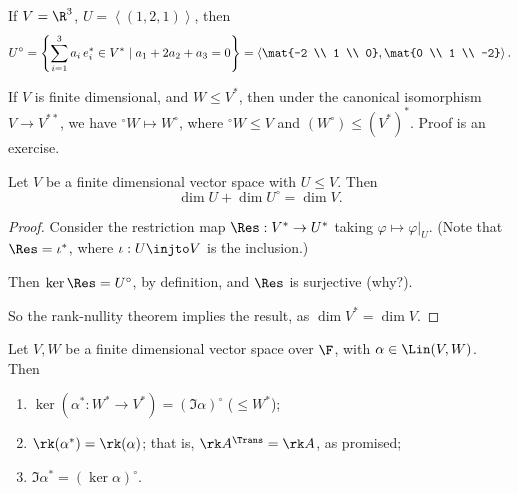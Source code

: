 \begin{example}
	If $V=\R^3$, $U=\left\langle (1,2,1) \right\rangle$, then %
	\begin{equation*}
		U^\circ = \left\{\sum_{i=1}^3 a_i\,e_i^* \in V^* \mid a_1+2a_2+a_3 = 0 \right\}
		= \left\langle \mat{-2 \\ 1 \\ 0}, \mat{0 \\ 1 \\ -2} \right\rangle.
	\end{equation*}
\end{example}

\begin{remark}
	If $V$ is finite dimensional, and $W\leq V^*$, then under the canonical isomorphism $V\to V^{**}$, we have $^\circ W \mapsto W^\circ$, where $^\circ W\leq V$ and $(W^\circ)\leq (V^*)^*$. Proof is an exercise. %
\end{remark}

\begin{lemma}
	Let $V$ be a finite dimensional vector space with $U\leq V$. Then %
	\begin{equation*}
		\dim U+\dim U^\circ=\dim V.
	\end{equation*}
\end{lemma}

\begin{proof}
	Consider the restriction map $\Res:V^* \to U^*$ taking $\varphi\mapsto \varphi |_U$. (Note that $\Res=\iota^*$, where $\iota: U\injto V$ is the inclusion.) %
	
	Then $\ker\Res=U^\circ$, by definition, and $\Res$ is surjective (why?).
	
	So the rank-nullity theorem implies the result, as $\dim V^*=\dim V$.
\end{proof}

\begin{proposition}
	Let $V,W$ be a finite dimensional vector space over $\F$, with $\alpha\in \Lin(V,W)$. Then %
	\begin{enumerate}
		\shortskip
		\item $\ker(\alpha^*:W^*\to V^*)=\left( \Im\alpha \right)^\circ$ ($\leq W^*$);
		\item $\rk(\alpha^*) = \rk(\alpha)$; that is, $\rk A^\Trans = \rk A$, as promised;
		\item $\Im \alpha^* = \left( \ker\alpha \right)^\circ$.
	\end{enumerate}
\end{proposition}

